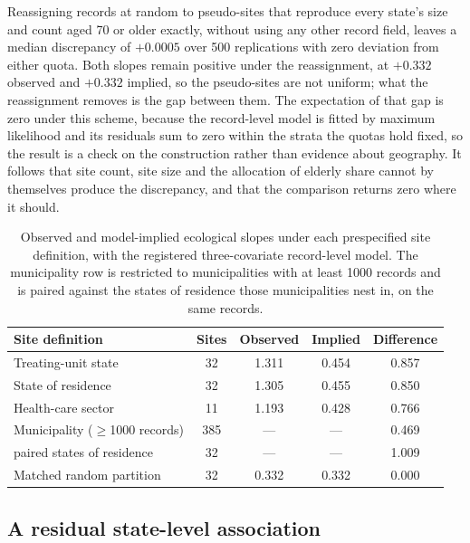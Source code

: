 \documentclass[11pt]{article}
\begin{document}
Reassigning records at random to pseudo-sites that reproduce every
state's size and count aged 70 or older exactly, without using any other
record field, leaves a median discrepancy of $+0.0005$ over 500
replications with zero deviation from either quota.  Both slopes remain
positive under the reassignment, at $+0.332$ observed and $+0.332$
implied, so the pseudo-sites are not uniform; what the reassignment
removes is the gap between them.  The expectation of that gap is zero
under this scheme, because the record-level model is fitted by maximum
likelihood and its residuals sum to zero within the strata the quotas
hold fixed, so the result is a check on the construction rather than
evidence about geography.  It follows that site count, site size and
the allocation of elderly share cannot by themselves produce the
discrepancy, and that the comparison returns zero where it should.

\begin{table}[t]
\centering
\caption{Observed and model-implied ecological slopes under each
prespecified site definition, with the registered three-covariate
record-level model.  The municipality row is restricted to municipalities
with at least 1000 records and is paired against the states of residence
those municipalities nest in, on the same records.}
\label{tab:sites}
\begin{tabular}{lcccc}
\toprule
Site definition & Sites & Observed & Implied & Difference \\
\midrule
Treating-unit state        & 32  & 1.311 & 0.454 & 0.857 \\
State of residence         & 32  & 1.305 & 0.455 & 0.850 \\
Health-care sector         & 11  & 1.193 & 0.428 & 0.766 \\
Municipality ($\geq$1000 records) & 385 & ---   & ---   & 0.469 \\
\;\;paired states of residence    & 32  & ---   & ---   & 1.009 \\
Matched random partition & 32  & 0.332 & 0.332 & 0.000 \\
\bottomrule
\end{tabular}
\end{table}

\subsection{A residual state-level association}
\end{document}
